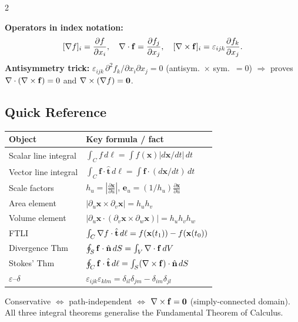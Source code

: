\documentclass[10pt,a4paper]{article}
\newcommand{\p}[2]{\frac{\partial #1}{\partial #2}}      %
\newcommand{\hvt}{\hat{\mathbf{t}}}
\newcommand{\hvn}{\hat{\mathbf{n}}}
\newcommand{\vx}{\mathbf{x}}
\newcommand{\vf}{\mathbf{f}}
\newcommand{\eu}{\mathbf{e}_u}
\begin{document}
\begin{multicols}{2}
\begin{defbox}
\textbf{Operators in index notation:}
\[
  [\bnabla f]_i=\p{f}{x_i},
  \quad
  \bnabla\cdot\vf=\p{f_j}{x_j},
  \quad
  [\bnabla\times\vf]_i=\varepsilon_{ijk}\p{f_k}{x_j}.
\]
\textbf{Antisymmetry trick:}
$\varepsilon_{ijk}\,\partial^2\!f_k/\partial x_i\partial x_j=0$
(antisym.\ $\times$ sym.\ $= 0$)
$\Rightarrow$ proves $\bnabla\cdot(\bnabla\times\vf)=0$ and
$\mathbf{\nabla}\times(\mathbf{\nabla} f)=\mathbf{0}$.
\end{defbox}

\subsection{Quick Reference}

\begin{center}
\small
\begin{tabular}{@{}ll@{}}
\toprule
\textbf{Object} & \textbf{Key formula / fact}\\
\midrule
Scalar line integral  & $\int_C f\,d\ell=\int f(\vx)|d\vx/dt|\,dt$\\
Vector line integral  & $\int_C\vf\cdot\hvt\,d\ell=\int\vf\cdot(d\vx/dt)\,dt$\\
Scale factors         & $h_u=|\p{\vx}{u}|$,\; $\eu=(1/h_u)\p{\vx}{u}$\\
Area element          & $|\partial_u\vx\times\partial_v\vx|=h_uh_v$\\
Volume element        & $|\partial_u\vx\cdot(\partial_v\vx\times\partial_w\vx)|=h_uh_vh_w$\\
FTLI                  & $\int_C\bnabla f\cdot\hvt\,d\ell=f(\vx(t_1))-f(\vx(t_0))$\\
Divergence Thm        & $\oint_S\vf\cdot\hvn\,dS=\int_V\bnabla\cdot\vf\,dV$\\
Stokes' Thm           & $\oint_C\vf\cdot\hvt\,d\ell=\int_S(\bnabla\times\vf)\cdot\hvn\,dS$\\
$\varepsilon$--$\delta$ & $\varepsilon_{ijk}\varepsilon_{klm}=\delta_{il}\delta_{jm}-\delta_{im}\delta_{jl}$\\
\bottomrule
\end{tabular}
\end{center}

\end{multicols}

\vspace{2pt}
\noindent\colorbox{headbg}{\parbox{\linewidth}{\centering\color{headfg}\small\vspace{2pt}
Conservative $\Leftrightarrow$ path-independent $\Leftrightarrow$ $\bnabla\times\vf=\mathbf{0}$
(simply-connected domain). \quad
All three integral theorems generalise the Fundamental Theorem of Calculus.
\vspace{2pt}}}
\end{document}
